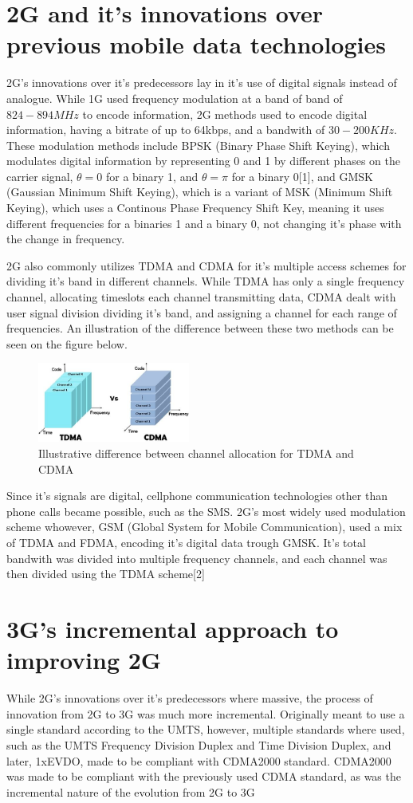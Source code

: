 \documentclass[10pt,journal,compsoc]{IEEEtran}
\begin{document}
\section{2G and it's innovations over previous mobile data technologies}
2G's innovations over it's predecessors lay in it's use of digital signals instead of analogue. While 1G used frequency modulation at a band of band of $824-894MHz$ to encode information, 2G methods used to encode digital information, having a bitrate of up to 64kbps, and a bandwith of $30-200KHz$. These modulation methods include BPSK (Binary Phase Shift Keying), which modulates digital information by representing 0 and 1 by different phases on the carrier signal, $ \theta = 0 $ for a binary 1, and $ \theta=\pi $ for a binary 0[1], and GMSK (Gaussian Minimum Shift Keying), which is a variant of MSK (Minimum Shift Keying), which uses a Continous Phase Frequency Shift Key, meaning it uses different frequencies for a binaries 1 and a binary 0, not changing it's  phase with the change in frequency.

2G also commonly utilizes TDMA and CDMA for it's multiple access schemes for dividing it's band in different channels. While TDMA has only a single frequency channel, allocating timeslots each channel transmitting data, CDMA dealt with user signal division dividing it's band, and assigning a channel for each range of frequencies. An illustration of the difference between these two methods can be seen on the figure below. 
\begin{figure}[h]
\centering
\includegraphics[width=5cm]{tdma-Vs-cdma.jpg}
\caption{Illustrative difference between channel allocation for TDMA and CDMA}
\end{figure}

Since it's signals are digital, cellphone communication technologies other than phone calls became possible, such as the SMS. 2G's most widely used modulation scheme whowever, GSM (Global System for Mobile Communication), used a mix of TDMA and FDMA, encoding it's digital data trough GMSK. It's total bandwith was divided into multiple frequency channels, and each channel was then divided using the TDMA scheme[2]

\section{3G's incremental approach to improving 2G}
While 2G's innovations over it's predecessors where massive, the process of innovation from 2G to 3G was much more incremental. Originally meant to use a single standard according to the UMTS, however, multiple standards where used, such as the UMTS Frequency Division Duplex and Time Division Duplex, and later, 1xEVDO, made to be compliant with CDMA2000 standard. CDMA2000 was made to be compliant with the previously used CDMA standard, as was the incremental nature of the evolution from 2G to 3G
\end{document}

